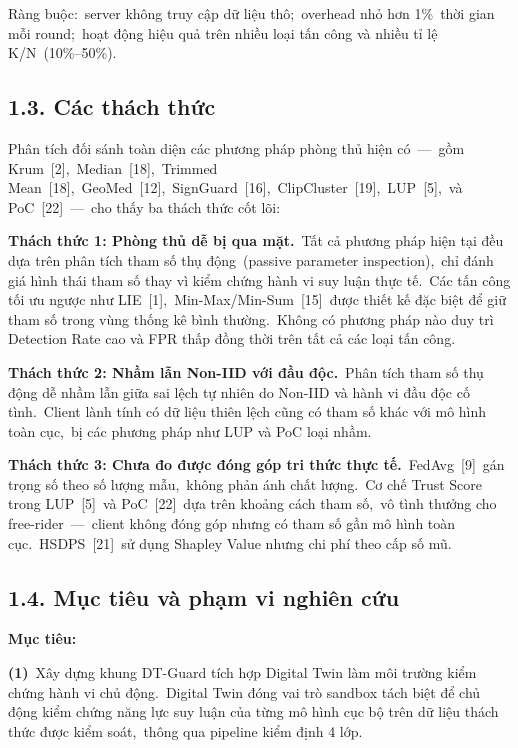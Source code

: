Ràng buộc:~server không truy cập dữ liệu thô;~overhead nhỏ hơn 1\%~thời gian mỗi round;~hoạt động hiệu quả trên nhiều loại tấn công và nhiều tỉ lệ K/N~(10\%--50\%).

\subsection{1.3. Các thách thức}\label{cuxe1c-thuxe1ch-thux1ee9c}

Phân tích đối sánh toàn diện các phương pháp phòng thủ hiện có~---~gồm Krum~{[}2{]},~Median~{[}18{]},~Trimmed Mean~{[}18{]},~GeoMed~{[}12{]},~SignGuard~{[}16{]},~ClipCluster~{[}19{]},~LUP~{[}5{]},~và PoC~{[}22{]}~---~cho thấy ba thách thức cốt lõi:

\textbf{Thách thức 1: Phòng thủ dễ bị qua mặt.}~Tất cả phương pháp hiện tại đều dựa trên phân tích tham số thụ động~(passive parameter inspection),~chỉ đánh giá hình thái tham số thay vì kiểm chứng hành vi suy luận thực tế.~Các tấn công tối ưu ngược như LIE~{[}1{]},~Min-Max/Min-Sum~{[}15{]}~được thiết kế đặc biệt để giữ tham số trong vùng thống kê bình thường.~Không có phương pháp nào duy trì Detection Rate cao và FPR thấp đồng thời trên tất cả các loại tấn công.

\textbf{Thách thức 2: Nhầm lẫn Non-IID với đầu độc.}~Phân tích tham số thụ động dễ nhầm lẫn giữa sai lệch tự nhiên do Non-IID và hành vi đầu độc cố tình.~Client lành tính có dữ liệu thiên lệch cũng có tham số khác với mô hình toàn cục,~bị các phương pháp như LUP và PoC loại nhầm.

\textbf{Thách thức 3: Chưa đo được đóng góp tri thức thực tế.}~FedAvg~{[}9{]}~gán trọng số theo số lượng mẫu,~không phản ánh chất lượng.~Cơ chế Trust Score trong LUP~{[}5{]}~và PoC~{[}22{]}~dựa trên khoảng cách tham số,~vô tình thưởng cho free-rider~---~client không đóng góp nhưng có tham số gần mô hình toàn cục.~HSDPS~{[}21{]}~sử dụng Shapley Value nhưng chi phí theo cấp số mũ.

\subsection{1.4. Mục tiêu và phạm vi nghiên cứu}\label{mux1ee5c-tiuxeau-vuxe0-phux1ea1m-vi-nghiuxean-cux1ee9u}

\textbf{Mục tiêu:}

\textbf{(1)}~Xây dựng khung DT-Guard tích hợp Digital Twin làm môi trường kiểm chứng hành vi chủ động.~Digital Twin đóng vai trò sandbox tách biệt để chủ động kiểm chứng năng lực suy luận của từng mô hình cục bộ trên dữ liệu thách thức được kiểm soát,~thông qua pipeline kiểm định 4 lớp.

